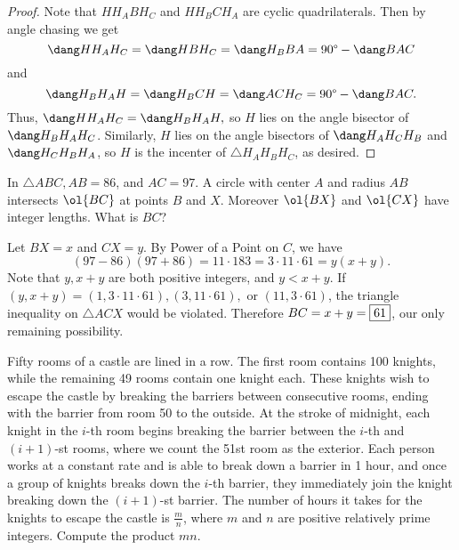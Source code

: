 \documentclass[letterpaper,oneside]{scrartcl}
\begin{document}
\begin{proof}
  Note that \(HH_ABH_C\) and \(HH_BCH_A\) are cyclic quadrilaterals. Then by angle chasing we get
  \[\dang HH_AH_C = \dang HBH_C = \dang H_BBA = 90\degree - \dang BAC\]
  and
  \[\dang H_BH_AH = \dang H_BCH = \dang ACH_C = 90\degree - \dang BAC.\]
  Thus, \(\dang HH_AH_C = \dang H_BH_AH,\) so \(H\) lies on the angle bisector of \(\dang H_BH_AH_C\). Similarly, \(H\) lies on the angle bisectors of \(\dang H_AH_CH_B\) and \(\dang H_CH_BH_A\), so \(H\) is the incenter of \(\triangle H_AH_BH_C\), as desired.
\end{proof}
\newpage
\begin{problem*}
   In \(\triangle ABC, AB = 86\), and \(AC = 97\). A circle with center \(A\) and radius \(AB\) intersects \(\ol{BC}\) at points \(B\) and \(X\). Moreover \(\ol{BX}\) and \(\ol{CX}\) have integer lengths. What is \(BC\)?
\end{problem*}
\begin{soln}
  Let \(BX = x\) and \(CX = y\). By Power of a Point on \(C\), we have
  \[(97-86)(97+86) = 11\cdot183 = 3\cdot11\cdot61=y(x+y).\]
  Note that \(y,x+y\) are both positive integers, and \(y<x+y\). If \((y,x+y) = (1,3\cdot11\cdot61),(3,11\cdot61),\) or \((11,3\cdot61)\), the triangle inequality on \(\triangle ACX\) would be violated. Therefore \(BC = x+y = \fbox{61}\), our only remaining possibility.
\end{soln}
\begin{problem*}
  Fifty rooms of a castle are lined in a row. The first room contains 100 knights, while the remaining 49 rooms contain one knight each. These knights wish to escape the castle by breaking the barriers between consecutive rooms, ending with the barrier from room 50 to the outside. At the stroke of midnight, each knight in the \(i\)-th room begins breaking the barrier between the \(i\)-th and \((i + 1)\)-st rooms, where we count the 51st room as the exterior. Each person works at a constant rate and is able to break down a barrier in 1 hour, and once a group of knights breaks down the \(i\)-th barrier, they immediately join the knight breaking down the \((i + 1)\)-st barrier. The number of hours it takes for the knights to escape the castle is \(\tfrac{m}{n}\), where \(m\) and \(n\) are positive relatively prime integers. Compute the product \(mn\).
\end{problem*}
\end{document}
